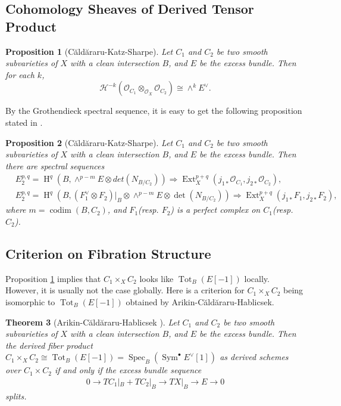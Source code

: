 \documentclass[12pt]{amsart}
\newtheorem{theorem}{Theorem}[section]
\newtheorem{proposition}[theorem]{Proposition}
\theoremstyle{definition}
\theoremstyle{remark}
\numberwithin{equation}{section}
\newcommand{\shH}{\mathcal{H}}
\newcommand{\shO}{\mathcal{O}}
\newcommand{\codim}{\operatorname{codim}}
\newcommand{\Ext}{\operatorname{Ext}}
\newcommand{\Spec}{\operatorname{Spec}}
\newcommand{\Sym}{\operatorname{Sym}}
\newcommand{\Tot}{\operatorname{Tot}}
\newcommand{\arw}{\longrightarrow}
\newcommand{\Hdot}{\operatorname{H}}
\begin{document}
\subsection{Cohomology Sheaves of Derived Tensor Product}
\begin{proposition}[C\u{a}ld\u{a}raru-Katz-Sharpe\cite{caldararu2003d}]\label{tor}
    Let $C_1$ and $C_2$ be two smooth subvarieties of $X$ with a clean intersection $B$, and $E$ be the excess bundle. Then for each $k$,
$$\shH^{-k}(\shO_{C_1}\otimes_{\shO_X} \shO_{C_2})\cong \wedge^k E^{\vee}.$$
\end{proposition}
By the Grothendieck spectral sequence, it is easy to get the following proposition stated in \cite{caldararu2003d}.
\begin{proposition}[C\u{a}ld\u{a}raru-Katz-Sharpe\cite{caldararu2003d}]\label{prop: ss}
    Let $C_1$ and $C_2$ be two smooth subvarieties of $X$ with a clean intersection $B$, and $E$ be the excess bundle. Then there are spectral sequences
    \begin{align}
        &E_2^{p,q}=\Hdot^q(B, \wedge^{p-m}E\otimes det(N_{B/C_2}))\Longrightarrow \Ext_X^{p+q}(j_{1*}\shO_{C_1},j_{2*}\shO_{C_2}),\\
        &E_2^{p,q}=\Hdot^q(B, (F_1^{\vee}\otimes F_2)|_B\otimes\wedge^{p-m}E\otimes \det(N_{B/C_2}))\Longrightarrow \Ext_X^{p+q}(j_{1*}F_1,j_{2*}F_2),
    \end{align}
where $m=\codim (B, C_2)$, and $F_1$(resp. $F_2$) is a perfect complex on $C_1$(resp. $C_2$).
\end{proposition}

\subsection{Criterion on Fibration Structure}
Proposition \ref{tor} implies that $C_1\times_X C_2$ looks like $\Tot_B(E[-1])$ locally. However, it is usually not the case globally. Here is a criterion for $C_1\times_X C_2$ being isomorphic to $\Tot_B(E[-1])$ obtained by Arikin-C\u{a}ld\u{a}raru-Hablicsek\cite{arinkin2019formality}. 
\begin{theorem}[Arikin-C\u{a}ld\u{a}raru-Hablicsek \cite{arinkin2019formality}]\label{ACH}
Let $C_1$ and $C_2$ be two smooth subvarieties of $X$ with a clean intersection $B$, and $E$ be the excess bundle. Then the derived fiber product
 $C_1\times_X C_2\cong \Tot_B(E[-1])=\Spec_B(\Sym^{\bullet} E^{\vee}[1])$ as derived schemes over $C_1\times C_2$ if and only if the excess bundle sequence
 \begin{align}\label{excessplit}
    0\arw TC_1|_B+TC_2|_B\arw TX|_B \arw E\arw 0 
 \end{align}
splits.
\end{theorem}
\end{document}
